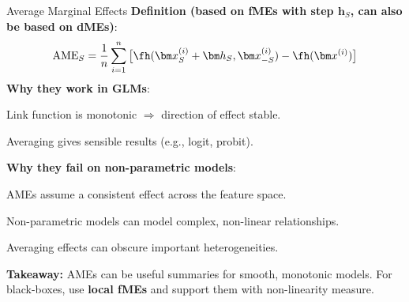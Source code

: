\documentclass[10pt,compress,t,notes=noshow, xcolor=table]{beamer}
\begin{document}
\begin{framev}[align=top]{Average Marginal Effects}
\textbf{Definition (based on fMEs with step $\bm h_S$, can also be based on dMEs)}:
$$
\text{AME}_S = \frac{1}{n} \sum_{i=1}^n \big[\fh(\bm x_S^{(i)} + \bm h_S, \bm x_{-S}^{(i)}) - \fh(\bm x^{(i)})\big]
$$
\textbf{Why they work in GLMs}:
\begin{itemizeM}
\item Link function is monotonic $\Rightarrow$ direction of effect stable.
\item Averaging gives sensible results (e.g., logit, probit).
\end{itemizeM}
\spacer[0.25]
\textbf{Why they fail on non-parametric models}:
\begin{itemizeM}
\item AMEs assume a consistent effect across the feature space.
\item Non-parametric models can model complex, non-linear relationships.
\item Averaging effects can obscure important heterogeneities.
\end{itemizeM}
\spacer[0.25]
\textbf{Takeaway:} AMEs can be useful summaries for smooth, monotonic models.
For black-boxes, use \textbf{local fMEs} and support them with non-linearity measure.
\end{framev}
\end{document}
